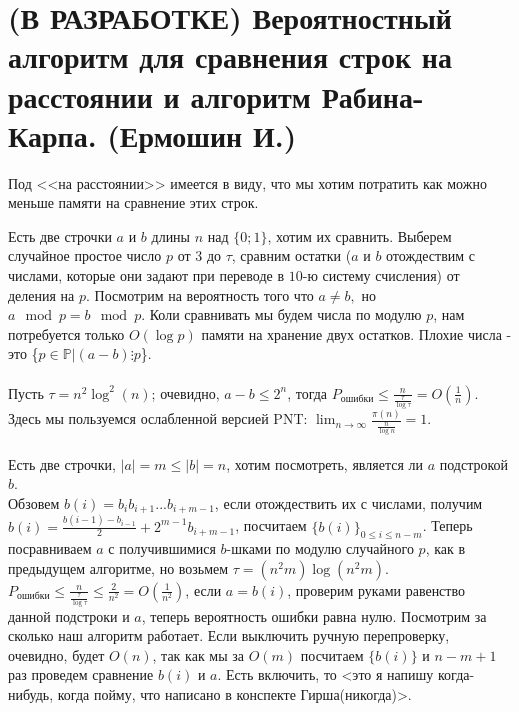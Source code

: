 \section{(В РАЗРАБОТКЕ) Вероятностный алгоритм для сравнения строк на расстоянии и алгоритм Рабина-Карпа. (Ермошин И.)}


Под <<на расстоянии>> имеется в виду, что мы хотим потратить как можно меньше памяти на сравнение этих строк.

Есть две строчки $a$ и $b$ длины $n$ над $\{0;1\}$, хотим их сравнить. Выберем случайное простое число $p$ от $3$ до $\tau$, сравним остатки ($a$ и $b$ отождествим с числами, которые они задают при переводе в $10$-ю систему счисления) от деления на $p$. Посмотрим на вероятность того что $a\neq b,$ но $a\mod{p}=b\mod{p}$. Коли сравнивать мы будем числа по модулю $p$, нам потребуется только $O(\log p)$ памяти на хранение двух остатков.
Плохие числа - это \{$p\in\mathbb{P} | (a-b)\vdots p$\}.
\\
\\Пусть $\tau=n^2 \log^2(n)$; очевидно, $a-b\le 2^n$, тогда $P_{\text{ошибки}}\le\frac{n}{\frac{\tau}{\log\tau}}=O(\frac{1}{n})$. Здесь мы пользуемся ослабленной версией PNT: $\lim_{n\to\infty} \frac{\pi(n)}{\frac{n}{\log n}}=1$.
\\
\\
Есть две строчки, $|a|=m\le|b|=n$, хотим посмотреть, является ли $a$ подстрокой $b$.
\\Обзовем $b(i)=b_i b_{i+1}...b_{i+m-1}$, если отождествить их с числами, получим $b(i)=\frac{b(i-1)-b_{i-1}}{2}+2^{m-1} b_{i+m-1}$, посчитаем $\{b(i)\}_{0\le i\le n-m}$. Теперь посравниваем $a$ с получившимися $b$-шками по модулю случайного $p$, как в предыдущем алгоритме, но возьмем $\tau=(n^2m)\log(n^2m)$.$P_{\text{ошибки}}\le\frac{n}{\frac{\tau}{\log\tau}}\le\frac{2}{n^2}=O(\frac{1}{n^2})$, если $a=b(i)$, проверим руками равенство данной подстроки и $a$, теперь вероятность ошибки равна нулю. Посмотрим за сколько наш алгоритм работает. Если выключить ручную перепроверку, очевидно, будет $O(n)$, так как мы за $O(m)$ посчитаем $\{b(i)\}$ и $n-m+1$ раз проведем сравнение $b(i)$ и $a$. Есть включить, то <это я напишу когда-нибудь, когда пойму, что написано в конспекте Гирша(никогда)>.